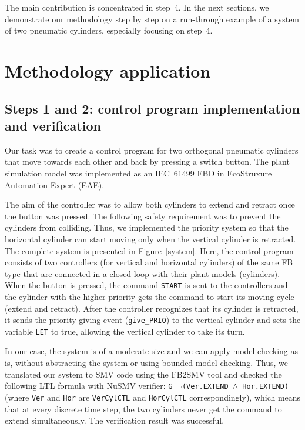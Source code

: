 \begin{bibunit}
The main contribution is concentrated in step~4.
In the next sections, we demonstrate our methodology step by step on a run-through example of a system of two pneumatic cylinders, especially focusing on step~4.

\section{Methodology application}
\label{sec:methodappl}
\subsection{Steps 1 and 2: control program implementation and verification}

Our task was to create a control program for two orthogonal pneumatic cylinders that move towards each other and back by pressing a switch button. The plant simulation model was implemented as an IEC~61499 FBD in EcoStruxure Automation Expert (EAE).

The aim of the controller was to allow both cylinders to extend and retract once the button was pressed. The following safety requirement was to prevent the cylinders from colliding.
Thus, we implemented the priority system so that the horizontal cylinder can start moving only when the vertical cylinder is retracted. The complete system is presented in Figure~\ref{system}. Here, the control program consists of two controllers (for vertical and horizontal cylinders) of the same FB type that are connected in a closed loop with their plant models (cylinders). When the button is pressed, the command \texttt{START} is sent to the controllers and the cylinder with the higher priority gets the command to start its moving cycle (extend and retract). After the controller recognizes that its cylinder is retracted, it sends the priority giving event (\texttt{give\_PRIO}) to the vertical cylinder and sets the variable \texttt{LET} to true, allowing the vertical cylinder to take its turn.

In our case, the system is of a moderate size and we can apply model checking as is, without abstracting the system or using bounded model checking.
Thus, we translated our system to SMV code using the FB2SMV tool and checked the following LTL formula with NuSMV verifier: \texttt{G $\neg$(Ver.EXTEND $\land$ Hor.EXTEND)} (where \texttt{Ver} and \texttt{Hor} are \texttt{VerCylCTL} and \texttt{HorCylCTL} correspondingly), 
which means that at every discrete time step, the two cylinders never get the command to extend simultaneously. The verification result was successful. 


\end{bibunit}
